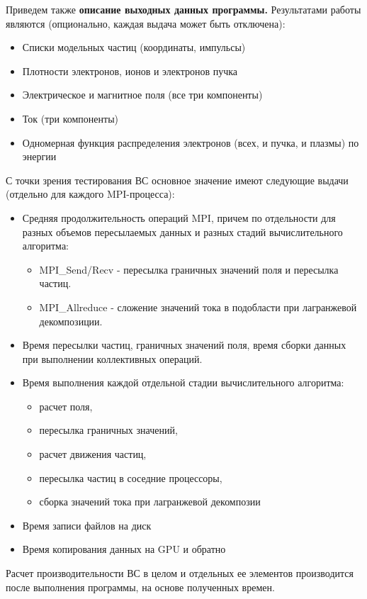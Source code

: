 Приведем также
\textbf{описание выходных данных программы.}
Результатами работы являются
(опционально, каждая выдача может быть отключена):
\begin{itemize}
	\item Списки модельных частиц (координаты, импульсы)
	\item Плотности электронов, ионов и электронов пучка
	\item Электрическое и магнитное поля (все три компоненты)
	\item Ток (три компоненты)
	\item Одномерная функция распределения электронов (всех, и пучка, и плазмы) по энергии
\end{itemize}

С точки зрения тестирования ВС основное значение имеют следующие выдачи (отдельно для каждого MPI-процесса):

\begin{itemize}
	\item Средняя продолжительность операций MPI, причем по отдельности для разных объемов пересылаемых данных и разных стадий вычислительного алгоритма:
	\begin{itemize}
		\item MPI\_Send/Recv - пересылка граничных значений поля и пересылка частиц.
		\item MPI\_Allreduce - сложение значений тока в подобласти при лагранжевой декомпозиции.
		
	\end{itemize}	
	\item Время пересылки частиц, граничных значений поля, время сборки данных при выполнении коллективных операций.   
	\item Время выполнения каждой отдельной стадии вычислительного алгоритма:
	\begin{itemize}
		\item расчет поля, 
		\item пересылка граничных значений, 
		\item расчет движения частиц, 
		\item пересылка частиц в соседние процессоры, 
		\item сборка значений тока при лагранжевой декомпозии
	\end{itemize}
	\item Время записи файлов на диск 
	\item Время копирования данных на GPU и обратно
	
\end{itemize}
Расчет производительности ВС в целом и отдельных ее элементов производится после выполнения программы, на основе полученных времен. 



